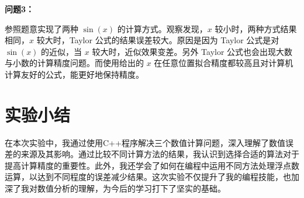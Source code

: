\documentclass[UTF8]{ctexart}
\begin{document}
\textbf{问题3：}

参照题意实现了两种 $\sin(x)$ 的计算方式。观察发现，$x$ 较小时，两种方式结果相同，$x$ 较大时，Taylor 公式的结果误差较大。原因是因为 Taylor 公式是对 $\sin(x)$ 的近似，当 $x$ 较大时，近似效果变差。另外 Taylor 公式也会出现大数与小数的计算精度问题。而使用给出的 $x$ 在任意位置拟合精度都较高且对计算机计算友好的公式，能更好地保持精度。
\vspace{3.50cm}

\section{实验小结}

\vspace{0.5cm}

在本次实验中，我通过使用C++程序解决三个数值计算问题，深入理解了数值误差的来源及其影响。通过比较不同计算方法的结果，我认识到选择合适的算法对于提高计算精度的重要性。此外，我还学会了如何在编程中运用不同方法处理浮点数运算，以达到不同程度的误差减少结果。这次实验不仅提升了我的编程技能，也加深了我对数值分析的理解，为今后的学习打下了坚实的基础。

\vspace{2.0cm}
\end{document}
